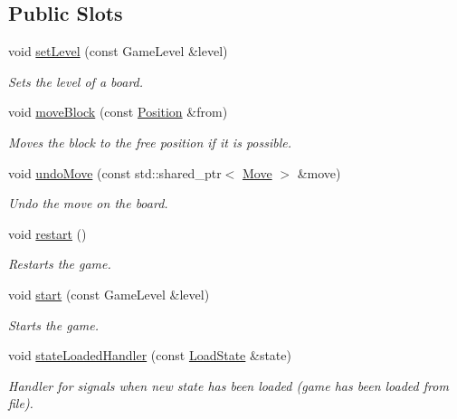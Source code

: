 \subsection*{Public Slots}
\begin{DoxyCompactItemize}
\item 
void \mbox{\hyperlink{class_blocks_model_aa5ca46eacee24fe51864845ecf6a1266}{set\+Level}} (const Game\+Level \&level)
\begin{DoxyCompactList}\small\item\em Sets the level of a board. \end{DoxyCompactList}\item 
void \mbox{\hyperlink{class_blocks_model_a8ce391f7ec760f11d166aead833aa002}{move\+Block}} (const \mbox{\hyperlink{struct_position}{Position}} \&from)
\begin{DoxyCompactList}\small\item\em Moves the block to the free position if it is possible. \end{DoxyCompactList}\item 
void \mbox{\hyperlink{class_blocks_model_a6707a7dac44d269c2d52e7904a7473ef}{undo\+Move}} (const std\+::shared\+\_\+ptr$<$ \mbox{\hyperlink{struct_move}{Move}} $>$ \&move)
\begin{DoxyCompactList}\small\item\em Undo the move on the board. \end{DoxyCompactList}\item 
void \mbox{\hyperlink{class_blocks_model_a73cc9633752440b2060b5bb1f964d9e6}{restart}} ()
\begin{DoxyCompactList}\small\item\em Restarts the game. \end{DoxyCompactList}\item 
void \mbox{\hyperlink{class_blocks_model_a7e8f2f88ce1a2042772b50bf3d1321a2}{start}} (const Game\+Level \&level)
\begin{DoxyCompactList}\small\item\em Starts the game. \end{DoxyCompactList}\item 
void \mbox{\hyperlink{class_blocks_model_a9fc884d31e972c84e2e3dcbce73b8377}{state\+Loaded\+Handler}} (const \mbox{\hyperlink{struct_load_state}{Load\+State}} \&state)
\begin{DoxyCompactList}\small\item\em Handler for signals when new state has been loaded (game has been loaded from file). \end{DoxyCompactList}\end{DoxyCompactItemize}
